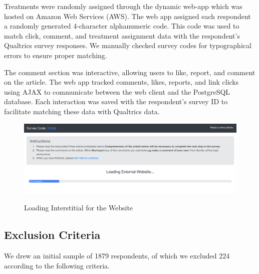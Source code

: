 \documentclass[]{article}
\begin{document}
Treatments were randomly assigned through the dynamic web-app which was hosted on Amazon Web Services (AWS). The web app assigned each respondent a randomly generated 4-character alphanumeric code. This code was used to match click, comment, and treatment assignment data with the respondent's Qualtrics survey responses. We manually checked survey codes for typographical errors to ensure proper matching.

The comment section was interactive, allowing users to like, report, and comment on the article. The web app tracked comments, likes, reports, and link clicks using AJAX to communicate between the web client and the PostgreSQL database. Each interaction was saved with the respondent's survey ID to facilitate matching these data with Qualtrics data.

\vspace{-1em}
\begin{figure}[!htbp]
  \centering
  \caption{Loading Interstitial for the Website}
  \vspace{1em}
  \includegraphics[width=.9\textwidth]{figures/loading_interstitial.pdf}\\
  \label{hom_uns}
\end{figure}

\subsection{Exclusion Criteria}

We drew an initial sample of 1879 respondents, of which we excluded 224 according to the following criteria.
\end{document}
